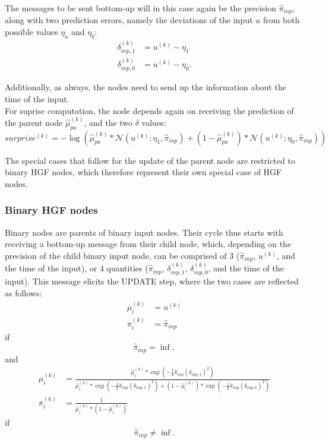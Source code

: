 The messages to be sent bottom-up will in this case again be the precision $\hat{\pi}_{inp}$, along with two prediction errors, namely the deviations of the input $u$ from both possible values $\eta_a$ and $\eta_b$:
\begin{align}
    \delta_{inp, 1}^{(k)} &= u^{(k)} - \eta_1\\
    \delta_{inp, 0}^{(k)} &= u^{(k)} - \eta_0.
\end{align}

Additionally, as always, the nodes need to send up the information about the time of the input. \\

For suprise computation, the node depends again on receiving the prediction of the parent node $\hat{\mu}_{pa}^{(k)}$, and the two $\delta$ values:
\begin{equation}
    surprise^{(k)} = -\log(\hat{\mu}_{pa}^{(k)} * \mathcal{N}(u^{(k)}; \eta_1, \hat{\pi}_{inp}) + (1-\hat{\mu}_{pa}^{(k)}) * \mathcal{N}(u^{(k)}; \eta_0, \hat{\pi}_{inp}))
\end{equation}

The special cases that follow for the update of the parent node are restricted to binary HGF nodes, which therefore represent their own special case of HGF nodes. 

\subsubsection{Binary HGF nodes}
Binary nodes are parents of binary input nodes. Their cycle thus starts with receiving a bottom-up message from their child node, which, depending on the precision of the child binary input node, can be comprised of 3 ($\hat{\pi}_{inp}$, $u^{(k)}$, and the time of the input), or 4 quantities ($\hat{\pi}_{inp}$, $\delta_{inp,1}^{(k)}$, $\delta_{inp,0}^{(k)}$, and the time of the input). This message elicits the \textsf{UPDATE step}, where the two cases are reflected as follows:
\begin{align}
    \mu_i^{(k)} &= u^{(k)}\\
    \pi_i^{(k)} &= \hat{\pi}_{inp}
\end{align}
if 
\begin{equation}
    \hat{\pi}_{inp} = \inf,
\end{equation}
and
\begin{align}
    \mu_i^{(k)} &= \frac{ \hat{\mu}_i^{(k)} * \exp(-\frac{1}{2} \hat{\pi}_{inp} (\delta_{inp, 1})^{2}) }{ \hat{\mu}_i^{(k)} * \exp(-\frac{1}{2} \hat{\pi}_{inp} (\delta_{inp, 1})^{2}) + (1-\hat{\mu}_i^{(k)}) * \exp(-\frac{1}{2} \hat{\pi}_{inp} (\delta_{inp, 0})^{2})  } \\
    \pi_i^{(k)} &= \frac{1}{\hat{\mu}_i^{(k)} * (1-\hat{\mu}_i^{(k)})}
\end{align}
if 
\begin{equation}
    \hat{\pi}_{inp} \neq \inf.
\end{equation}

